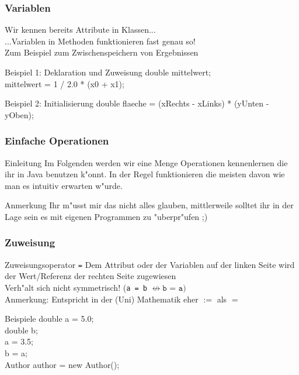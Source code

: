 \documentclass{beamer}
\begin{document}
\begin{frame}
\frametitle{Variablen}
\begin{block}{}
Wir kennen bereits Attribute in Klassen...\pause\\
...Variablen in Methoden funktionieren fast genau so!\pause\\[0.5em]
Zum Beispiel zum Zwischenspeichern von Ergebnissen
\end{block}

\pause

\begin{block}{Beispiel 1: Deklaration und Zuweisung}
\ttfamily
double mittelwert;\\
mittelwert = 1 / 2.0 * (x0 + x1);
\end{block}

\begin{block}{Beispiel 2: Initialisierung}
\ttfamily
double flaeche = (xRechts - xLinks) * (yUnten - yOben);
\end{block}
\end{frame}


\begin{frame}
\frametitle{Einfache Operationen}
\begin{block}{Einleitung}
Im Folgenden werden wir eine Menge Operationen kennenlernen die ihr in Java benutzen k"onnt. In der Regel funktionieren die meisten davon wie man es intuitiv erwarten w"urde.
\end{block}

\pause

\begin{block}{Anmerkung}
Ihr m"usst mir das nicht alles glauben, mittlerweile solltet ihr in der Lage sein es mit eigenen Programmen zu "uberpr"ufen ;)
\end{block}
\end{frame}


\begin{frame}
\frametitle{Zuweisung}
\begin{block}{Zuweisungsoperator \texttt{=}}
Dem Attribut oder der Variablen auf der linken Seite wird der Wert/Referenz der rechten Seite zugewiesen\\
\alert{Verh"alt sich nicht symmetrisch! (\texttt{a = b} $\not\leftrightarrow \texttt{b = a})$}\\
Anmerkung: Entspricht in der (Uni) Mathematik eher $:=$ als $=$
\end{block}

\pause

\begin{block}{Beispiele}
\ttfamily
double a = 5.0;\\
double b;\\
a = 3.5;\\
b = a;\\[0.5em]
Author author = new Author();
\end{block}
\end{frame}
\end{document}
